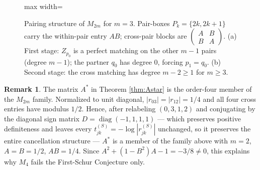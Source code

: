 \documentclass[11pt]{article}
\theoremstyle{plain}
\theoremstyle{definition}
\newtheorem{remark}[theorem]{Remark}
\begin{document}
\begin{aiblock}
\begin{figure}[H]
\begin{adjustbox}{max width=\textwidth}
\end{adjustbox}
\caption[Pairing structure of $M_{2m}$]{Pairing structure of $M_{2m}$ for $m=3$. Pair-boxes $P_k=\{2k,2k+1\}$ carry the within-pair entry $AB$; cross-pair blocks are $\left(\begin{smallmatrix}A&B\\B&A\end{smallmatrix}\right)$. (a) First stage: $Z_{p_0}$ is a perfect matching on the other $m-1$ pairs (degree $m-1$); the partner $q_0$ has degree $0$, forcing $p_1=q_0$. (b) Second stage: the cross matching has degree $m-2\ge1$ for $m\ge3$.}
\label{fig:pairing}
\end{figure}
\end{aiblock}
\begin{humanblock}
\begin{remark}\label{rem:astar-family}
The matrix $A^*$ in Theorem \ref{thm:Astar} is the order-four member of the $M_{2m}$ family. Normalized to unit diagonal, $|r_{03}|=|r_{12}|=1/4$ and all four cross entries have modulus $1/2$. Hence, after relabeling $(0,3,1,2)$ and conjugating by the diagonal sign matrix $D=\operatorname{diag}(-1,1,1,1)$ --- which preserves positive definiteness and leaves every $t^{(S)}_{jk}=-\log|r^{(S)}_{jk}|$ unchanged, so it preserves the entire cancellation structure --- $A^*$ is a member of the family above with $m=2$, $A=B=1/2$, $AB=1/4$. Since $A^2+(1-B^2)A-1=-3/8\neq0$, this explains why $M_4$ fails the First-Schur Conjecture only.
\end{remark}
\end{humanblock}
\end{document}
